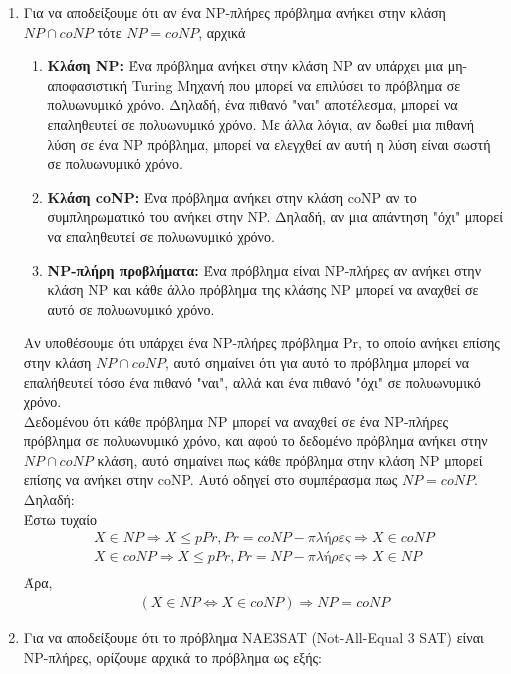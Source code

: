 \documentclass{article}
\begin{document}
\begin{enumerate}[label=(\alph*)]
\item Για να αποδείξουμε ότι αν ένα NP-πλήρες πρόβλημα ανήκει στην κλάση $NP \cap coNP$ τότε $NP = coNP$, αρχικά 
\begin{enumerate}[label=\arabic*)]
\item \textbf{Κλάση NP:} Ένα πρόβλημα ανήκει στην κλάση NP αν υπάρχει μια μη-αποφασιστική Turing Μηχανή που μπορεί να επιλύσει το πρόβλημα σε πολυωνυμικό χρόνο. Δηλαδή, ένα πιθανό "ναι" αποτέλεσμα, μπορεί να επαληθευτεί σε πολυωνυμικό χρόνο. Με άλλα λόγια, αν δωθεί μια πιθανή  λύση σε ένα NP πρόβλημα, μπορεί να ελεγχθεί αν αυτή η λύση είναι σωστή σε πολυωνυμικό χρόνο.
\\
\item \textbf{Κλάση coNP:} Ένα πρόβλημα ανήκει στην κλάση coNP αν το συμπληρωματικό του ανήκει στην NP. Δηλαδή, αν μια απάντηση "όχι" μπορεί να επαληθευτεί σε πολυωνυμικό χρόνο. 
\\
\item \textbf{NP-πλήρη προβλήματα:} Ένα πρόβλημα είναι NP-πλήρες αν ανήκει στην κλάση NP και κάθε άλλο πρόβλημα της κλάσης NP μπορεί να αναχθεί σε αυτό σε πολυωνυμικό χρόνο. 
\end{enumerate}
Αν υποθέσουμε ότι υπάρχει ένα NP-πλήρες πρόβλημα Pr, το οποίο ανήκει επίσης στην κλάση $NP \cap coNP$, αυτό σημαίνει ότι για αυτό το πρόβλημα μπορεί να επαλήθευτεί τόσο ένα πιθανό "ναι", αλλά και ένα πιθανό "όχι" σε πολυωνυμικό χρόνο.
\\
Δεδομένου ότι κάθε πρόβλημα NP μπορεί να αναχθεί σε ένα NP-πλήρες πρόβλημα σε πολυωνυμικό χρόνο, και αφού το δεδομένο πρόβλημα ανήκει στην $NP \cap coNP$ κλάση, αυτό σημαίνει πως κάθε πρόβλημα στην κλάση NP μπορεί επίσης να ανήκει στην coNP. Αυτό οδηγεί στο συμπέρασμα πως  $NP = coNP$.
\\
Δηλαδή: \\
Έστω τυχαίο 
\begin{align*}
X \in NP \Rightarrow X \leq p Pr, Pr = coNP-πλήρες \Rightarrow X \in coNP \\
X \in coNP \Rightarrow X \leq p Pr, Pr = NP-πλήρες \Rightarrow X \in NP \\
\end{align*}
Άρα, 
\begin{align*}
(X \in NP \iff X \in coNP) \Rightarrow NP = coNP
\end{align*}
\item Για να αποδείξουμε ότι το πρόβλημα NAE3SAT (Not-All-Equal 3 SAT) είναι NP-πλήρες, ορίζουμε αρχικά το πρόβλημα ως εξής:	
\begin{enumerate}[label = \arabic*]

\end{enumerate}
\end{enumerate}
\end{document}
